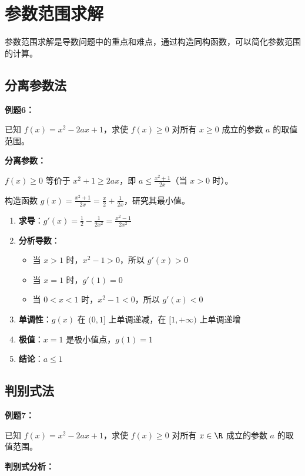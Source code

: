 \documentclass[a4paper,11pt]{ctexrep}
\newcommand{\exampleicon}{\ModeBadge[highlight]{例题}}
\newcommand{\analysisicon}{\ModeBadge[secondary]{分析}}
\theoremstyle{definition}
\begin{document}
\section{参数范围求解}

参数范围求解是导数问题中的重点和难点，通过构造同构函数，可以简化参数范围的计算。

\subsection{分离参数法}

\exampleicon \textbf{例题6：}

已知 $f(x) = x^2 - 2ax + 1$，求使 $f(x) \geq 0$ 对所有 $x \geq 0$ 成立的参数 $a$ 的取值范围。

\analysisicon \textbf{分离参数：}

$f(x) \geq 0$ 等价于 $x^2 + 1 \geq 2ax$，即 $a \leq \frac{x^2 + 1}{2x}$（当 $x > 0$ 时）。

构造函数 $g(x) = \frac{x^2 + 1}{2x} = \frac{x}{2} + \frac{1}{2x}$，研究其最小值。

\begin{enumerate}
    \item \textbf{求导}：$g'(x) = \frac{1}{2} - \frac{1}{2x^2} = \frac{x^2 - 1}{2x^2}$
    \item \textbf{分析导数}：
    \begin{itemize}
        \item 当 $x > 1$ 时，$x^2 - 1 > 0$，所以 $g'(x) > 0$
        \item 当 $x = 1$ 时，$g'(1) = 0$
        \item 当 $0 < x < 1$ 时，$x^2 - 1 < 0$，所以 $g'(x) < 0$
    \end{itemize}
    \item \textbf{单调性}：$g(x)$ 在 $(0, 1]$ 上单调递减，在 $[1, +\infty)$ 上单调递增
    \item \textbf{极值}：$x = 1$ 是极小值点，$g(1) = 1$
    \item \textbf{结论}：$a \leq 1$
\end{enumerate}

\subsection{判别式法}

\exampleicon \textbf{例题7：}

已知 $f(x) = x^2 - 2ax + 1$，求使 $f(x) \geq 0$ 对所有 $x \in \R$ 成立的参数 $a$ 的取值范围。

\analysisicon \textbf{判别式分析：}
\end{document}
